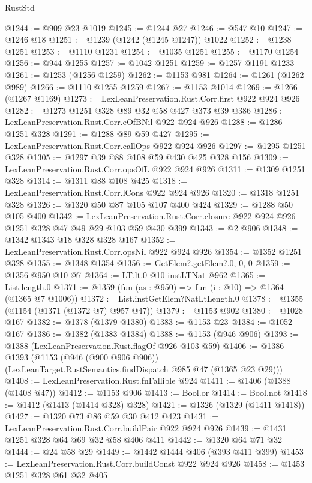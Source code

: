 \begin{lexlean}{RustStd}
\begin{coremodule}
{\begin{coremodule}
{{{{{{{{{{@1244 := @909 @23 @1019
@1245 := @1244 @27
@1246 := @547 @10
@1247 := @1246 @18
@1251 := @1239 (@1242 (@1245 @1247)) @1022
@1252 := @1238 @1251
@1253 := @1110 @1231
@1254 := @1035 @1251
@1255 := @1170 @1254
@1256 := @944 @1255
@1257 := @1042 @1251
@1259 := @1257 @1191 @1233
@1261 := @1253 (@1256 @1259)
@1262 := @1153 @981
@1264 := @1261 (@1262 @989)
@1266 := @1110 @1255 @1259
@1267 := @1153 @1014
@1269 := @1266 (@1267 @1169)
@1273 := LexLeanPreservation.Rust.Corr.first @922 @924 @926
@1282 := @1273 @1251 @328 @89 @32 @58 @427 @373 @39 @386
@1286 := LexLeanPreservation.Rust.Corr.eOfBNil @922 @924 @926
@1288 := @1286 @1251 @328
@1291 := @1288 @89 @59 @427
@1295 := LexLeanPreservation.Rust.Corr.callOps @922 @924 @926
@1297 := @1295 @1251 @328
@1305 := @1297 @39 @88 @108 @59 @430 @425 @328 @156
@1309 := LexLeanPreservation.Rust.Corr.opsOfL @922 @924 @926
@1311 := @1309 @1251 @328
@1314 := @1311 @88 @108 @425
@1318 := LexLeanPreservation.Rust.Corr.lCons @922 @924 @926
@1320 := @1318 @1251 @328
@1326 := @1320 @50 @87 @105 @107 @400 @424
@1329 := @1288 @50 @105 @400
@1342 := LexLeanPreservation.Rust.Corr.closure
    @922
    @924
    @926
    @1251
    @328
    @47
    @49
    @29
    @103
    @59
    @430
    @399
@1343 := @2 @906
@1348 := @1342 @1343 @18 @328 @328 @167
@1352 := LexLeanPreservation.Rust.Corr.opsNil @922 @924 @926
@1354 := @1352 @1251 @328
@1355 := @1348 @1354
@1356 := GetElem?.getElem?.{0, 0, 0}
@1359 := @1356 @950 @10 @7
@1364 := LT.lt.{0} @10 instLTNat @962
@1365 := List.length.{0}
@1371 := @1359 (fun (as : @950) => fun (i : @10) => @1364 (@1365 @7 @1006))
@1372 := List.instGetElem?NatLtLength.{0}
@1378 := @1355 (@1154 (@1371 (@1372 @7) @957 @47))
@1379 := @1153 @902
@1380 := @1028 @167
@1382 := @1378 (@1379 @1380)
@1383 := @1153 @23
@1384 := @1052 @167
@1386 := @1382 (@1383 @1384)
@1388 := @1153 (@946 @906)
@1393 := @1388 (LexLeanPreservation.Rust.flagOf @926 @103 @59)
@1406 := @1386
    @1393
    (@1153
      (@946 (@900 @906 @906))
      (LexLeanTarget.RustSemantics.findDispatch @985 @47 (@1365 @23 @29)))
@1408 := LexLeanPreservation.Rust.fnFallible @924
@1411 := @1406 (@1388 (@1408 @47))
@1412 := @1153 @906
@1413 := Bool.or
@1414 := Bool.not
@1418 := @1412 (@1413 (@1414 @328) @328)
@1421 := @1326 (@1329 (@1411 @1418))
@1427 := @1320 @73 @86 @59 @30 @412 @423
@1431 := LexLeanPreservation.Rust.Corr.buildPair @922 @924 @926
@1439 := @1431 @1251 @328 @64 @69 @32 @58 @406 @411
@1442 := @1320 @64 @71 @32
@1444 := @24 @58 @29
@1449 := @1442 @1444 @406 (@393 @411 @399)
@1453 := LexLeanPreservation.Rust.Corr.buildConst @922 @924 @926
@1458 := @1453 @1251 @328 @61 @32 @405
}}}}}}}}}}
\end{coremodule}}
\end{coremodule}
\end{lexlean}
